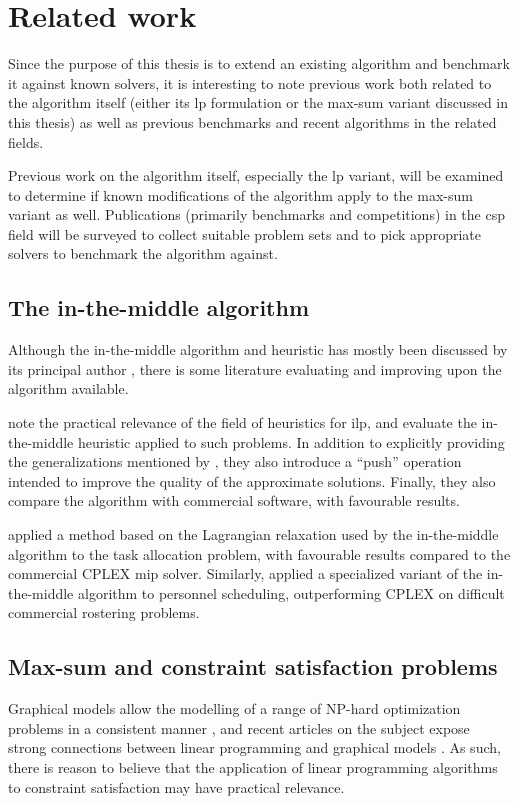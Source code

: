\section{Related work}
Since the purpose of this thesis is to extend an existing algorithm and benchmark it against known solvers, it is interesting to note previous work both related to the algorithm itself (either its \gls{lp} formulation or the max-sum variant discussed in this thesis) as well as previous benchmarks and recent algorithms in the related fields.

Previous work on the algorithm itself, especially the \gls{lp} variant, will be examined to determine if known modifications of the algorithm apply to the max-sum variant as well.
Publications (primarily benchmarks and competitions) in the \gls{csp} field will be surveyed to collect suitable problem sets and to pick appropriate solvers to benchmark the algorithm against.

\subsection{The in-the-middle algorithm}
Although the in-the-middle algorithm and heuristic has mostly been discussed by its principal author \parencites{Wedelin95}{Wedelin08}{Wedelin13}{Alefragis00}, there is some literature evaluating and improving upon the algorithm available.

\Textcite{Bastert10} note the practical relevance of the field of heuristics for \gls{ilp}, and evaluate the in-the-middle heuristic applied to such problems. In addition to explicitly providing the generalizations mentioned by \textcite{Wedelin95}, they also introduce a \enquote{push} operation intended to improve the quality of the approximate solutions. Finally, they also compare the algorithm with commercial software, with favourable results.

\Textcite{Ernst05} applied a method based on the Lagrangian relaxation used by the in-the-middle algorithm to the task allocation problem, with favourable results compared to the commercial CPLEX \gls{mip} solver.
Similarly, \textcite{Mason01} applied a specialized variant of the in-the-middle algorithm to personnel scheduling, outperforming CPLEX on difficult commercial rostering problems.

\subsection{Max-sum and constraint satisfaction problems}
Graphical models allow the modelling of a range of NP-hard optimization problems in a consistent manner \parencite{deGivry14}, and recent articles on the subject expose strong connections between linear programming and graphical models \parencites{Werner07}{Kolmogorov13}.
As such, there is reason to believe that the application of linear programming algorithms to constraint satisfaction may have practical relevance.

